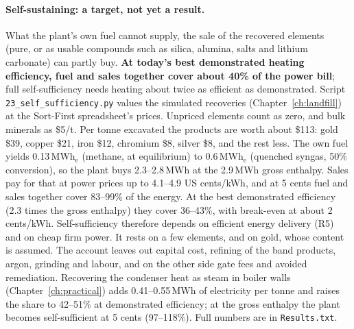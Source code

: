 \documentclass[11pt,a4paper]{article}
\begin{document}
\paragraph{Self-sustaining: a target, not yet a result.} What the plant's own fuel cannot supply, the sale of the recovered elements (pure, or as usable compounds such as silica, alumina, salts and lithium carbonate) can partly buy. \textbf{At today's best demonstrated heating efficiency, fuel and sales together cover about 40\% of the power bill}; full self-sufficiency needs heating about twice as efficient as demonstrated. Script \texttt{23\_self\_sufficiency.py} values the simulated recoveries (Chapter~\ref{ch:landfill}) at the Sort-First spreadsheet's prices. Unpriced elements count as zero, and bulk minerals as \$5/t. Per tonne excavated the products are worth about \$113: gold \$39, copper \$21, iron \$12, chromium \$8, silver \$8, and the rest less. The own fuel yields 0.13\,MWh$_\mathrm{e}$ (methane, at equilibrium) to 0.6\,MWh$_\mathrm{e}$ (quenched syngas, 50\% conversion), so the plant buys 2.3--2.8\,MWh at the 2.9\,MWh gross enthalpy. Sales pay for that at power prices up to 4.1--4.9 US cents/kWh, and at 5 cents fuel and sales together cover 83--99\% of the energy. At the best demonstrated efficiency (2.3 times the gross enthalpy) they cover 36--43\%, with break-even at about 2 cents/kWh. Self-sufficiency therefore depends on efficient energy delivery (R5) and on cheap firm power. It rests on a few elements, and on gold, whose content is assumed. The account leaves out capital cost, refining of the band products, argon, grinding and labour, and on the other side gate fees and avoided remediation. Recovering the condenser heat as steam in boiler walls (Chapter~\ref{ch:practical}) adds 0.41--0.55\,MWh of electricity per tonne and raises the share to 42--51\% at demonstrated efficiency; at the gross enthalpy the plant becomes self-sufficient at 5 cents (97--118\%). Full numbers are in \texttt{Results.txt}.

\end{document}
